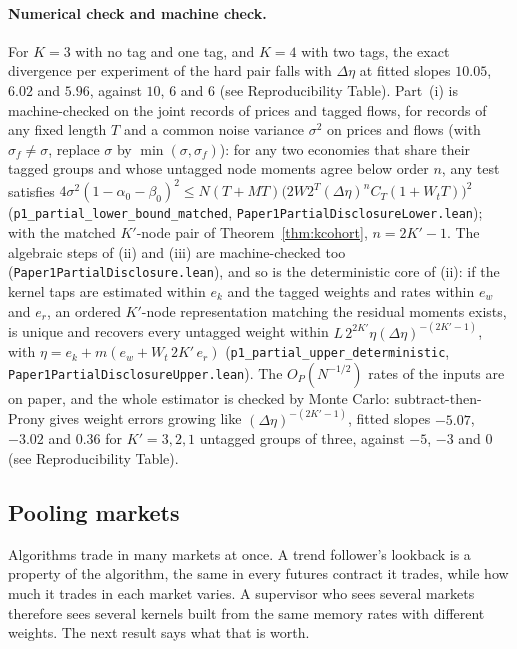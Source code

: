 \paragraph{Numerical check and machine check.} For $K=3$ with no tag and one tag, and $K=4$ with two tags, the exact divergence per experiment of the hard pair falls with $\Delta\eta$ at fitted slopes $10.05$, $6.02$ and $5.96$, against $10$, $6$ and $6$ (see Reproducibility Table). Part~(i) is machine-checked on the joint records of prices and tagged flows, for records of any fixed length $T$ and a common noise variance $\sigma^2$ on prices and flows (with $\sigma_f\ne\sigma$, replace $\sigma$ by $\min(\sigma,\sigma_f)$): for any two economies that share their tagged groups and whose untagged node moments agree below order $n$, any test satisfies $4\sigma^2(1-\alpha_0-\beta_0)^2\le N(T+MT)\bigl(2W2^T(\Delta\eta)^nC_T(1+W_tT)\bigr)^2$ (\texttt{p1\_partial\_lower\_bound\_matched}, \nolinkurl{Paper1PartialDisclosureLower.lean}); with the matched $K'$-node pair of Theorem~\ref{thm:kcohort}, $n=2K'-1$. The algebraic steps of (ii) and (iii) are machine-checked too (\nolinkurl{Paper1PartialDisclosure.lean}), and so is the deterministic core of (ii): if the kernel taps are estimated within $e_k$ and the tagged weights and rates within $e_w$ and $e_r$, an ordered $K'$-node representation matching the residual moments exists, is unique and recovers every untagged weight within $L\,2^{2K'}\eta(\Delta\eta)^{-(2K'-1)}$, with $\eta=e_k+m(e_w+W_t\,2K'\,e_r)$ (\texttt{p1\_partial\_upper\_deterministic}, \nolinkurl{Paper1PartialDisclosureUpper.lean}). The $O_P(N^{-1/2})$ rates of the inputs are on paper, and the whole estimator is checked by Monte Carlo: subtract-then-Prony gives weight errors growing like $(\Delta\eta)^{-(2K'-1)}$, fitted slopes $-5.07$, $-3.02$ and $0.36$ for $K'=3,2,1$ untagged groups of three, against $-5$, $-3$ and $0$ (see Reproducibility Table).

\subsection{Pooling markets}\label{sec:pool}

Algorithms trade in many markets at once. A trend follower's lookback is a property of the algorithm, the same in every futures contract it trades, while how much it trades in each market varies. A supervisor who sees several markets therefore sees several kernels built from the same memory rates with different weights. The next result says what that is worth.

